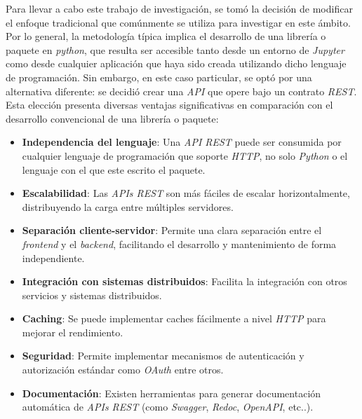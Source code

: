 \documentclass[11pt,a4paper,twoside]{thesis}
\begin{document}
Para llevar a cabo este trabajo de investigación, se tomó la decisión de modificar el enfoque tradicional que comúnmente se utiliza para investigar en este ámbito. Por lo general, la metodología típica implica el desarrollo de una librería o paquete en \textit{python}, que resulta ser accesible tanto desde un entorno de \textit{Jupyter} como desde cualquier aplicación que haya sido creada utilizando dicho lenguaje de programación. Sin embargo, en este caso particular, se optó por una alternativa diferente: se decidió crear una \textit{API} que opere bajo un contrato \textit{REST}. Esta elección presenta diversas ventajas significativas en comparación con el desarrollo convencional de una librería o paquete:


\begin{itemize}
	\setlength{\itemsep}{0pt}
	\setlength{\parskip}{0pt}

	\item \textbf{Independencia del lenguaje}: Una \textit{API REST} puede ser consumida por cualquier lenguaje de programación que soporte \textit{HTTP}, no solo \textit{Python} o el lenguaje con el que este escrito el paquete.

	\item \textbf{Escalabilidad}: Las \textit{APIs REST} son más fáciles de escalar horizontalmente, distribuyendo la carga entre múltiples servidores.

	\item \textbf{Separación cliente-servidor}: Permite una clara separación entre el \textit{frontend} y el \textit{backend}, facilitando el desarrollo y mantenimiento de forma independiente.

	\item \textbf{Integración con sistemas distribuidos}: Facilita la integración con otros servicios y sistemas distribuidos.

	\item \textbf{Caching}: Se puede implementar caches fácilmente a nivel \textit{HTTP} para mejorar el rendimiento.

	\item \textbf{Seguridad}: Permite implementar mecanismos de autenticación y autorización estándar como \textit{OAuth} entre otros.

	\item \textbf{Documentación}: Existen herramientas para generar documentación automática de \textit{APIs REST} (como \textit{Swagger}, \textit{Redoc}, \textit{OpenAPI}, etc..).
\end{itemize}
\end{document}
